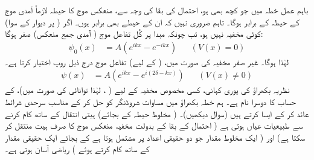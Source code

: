 باہم عمل خطہ  میں جو کچھ بھی ہو، احتمال کی بقا کی وجہ سے، منعکس موج کا حیطہ لازماً آمدی موج کے حیطہ کے برابر ہوگا۔ تاہم ضروری نہیں کہ ان کے حیطے بھی برابر ہوں۔ اگر (  پر دیوار کے سوا) کوئی مخفیہ نہیں ہو، تب چونکہ مبدا پر کُل تفاعل موج ( آمدی جمع منعکس) صفر ہوگا: 
\begin{align}
	\psi_0(x)& = A\left(e^{ikx}-e^{-ikx}\right)&&(V(x)=0)
\end{align}
لہٰذا  ہوگا۔ غیر صفر مخفیہ کی صورت میں، (  کے لیے) تفاعل موج درج ذیل روپ اختیار کرتا ہے۔
\begin{align}\label{مساوات_بکھراو_مخفیہ_غیر_صفر}
	\psi(x) &= A\left(e^{ikx}-e^{i(2\delta-kx)}\right)&&(V(x)\neq0)
\end{align}
نظریہ بکھراؤ کی پوری کہانی، کسی مخصوص مخفیہ کے لیے ( ، لہٰذا توانائی  کی صورت میں)،   کے حساب کا دوسرا نام ہے۔ ہم خطہ بکھراؤ  میں مساوات شروڈنگر کو حل کر کے مناسب سرحدی شرائط عائد کر کے ایسا کرتے ہیں (سوال  دیکھیں)۔ ( مخلوط حیطہ  کے بجائے) ہیتی انتقال کے ساتھ کام کرنے سے طبیعیات عیاں ہوتی ہے ( احتمال کے بقا کے بدولت مخفیہ منعکس موج کا صرف ہیت منتقل کر سکتا ہے) اور ( ایک مخلوط مقدار جو دو حقیقی اعداد پر مشتمل ہوتا ہے کے بجائے ایک حقیقی مقدار کے ساتھ کام کرتے ہوئے ) ریاضی آسان ہوتی ہے۔

